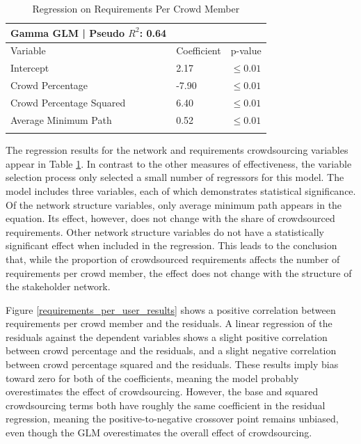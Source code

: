 \begin{table}
\caption{Regression on Requirements Per Crowd Member}
\label{requirements_per_user_regression}
\begin{tabular}{lll}
Gamma GLM | Pseudo $R^2$: 0.64 \\
\hline\noalign{\smallskip}
Variable & Coefficient & p-value  \\
\noalign{\smallskip}\hline\noalign{\smallskip}
Intercept & 2.17 & $\leq 0.01$ \\
Crowd Percentage & -7.90 & $\leq 0.01$ \\
Crowd Percentage Squared & 6.40 & $\leq 0.01$  \\
Average Minimum Path & 0.52 & $\leq 0.01$  \\
\noalign{\smallskip}\hline
\end{tabular}
\end{table}

The regression results for the network and requirements crowdsourcing variables appear in Table \ref{requirements_per_user_regression}. In contrast to the other measures of effectiveness, the variable selection process only selected a small number of regressors for this model. The model includes three variables, each of which demonstrates statistical significance. Of the network structure variables, only average minimum path appears in the equation. Its effect, however, does not change with the share of crowdsourced requirements. Other network structure variables do not have a statistically significant effect when included in the regression. This leads to the conclusion that, while the proportion of crowdsourced requirements affects the number of requirements per crowd member, the effect does not change with the structure of the stakeholder network. 

Figure \ref{requirements_per_user_results} shows a positive correlation between requirements per crowd member and the residuals. A linear regression of the residuals against the dependent variables shows a slight positive correlation between crowd percentage and the residuals, and a slight negative correlation between crowd percentage squared and the residuals. These results imply bias toward zero for both of the coefficients, meaning the model probably overestimates the effect of crowdsourcing. However, the base and squared crowdsourcing terms both have roughly the same coefficient in the residual regression, meaning the positive-to-negative crossover point remains unbiased, even though the GLM overestimates the overall effect of crowdsourcing.


